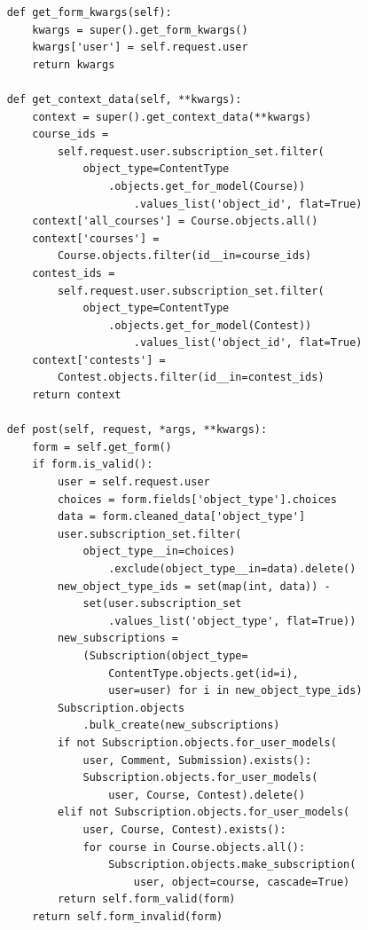 \documentclass[14pt, a4paper, oneside]{extarticle}
\begin{document}
\begin{enumerate}[wide, labelindent=0pt]
{\begin{verbatim}
    def get_form_kwargs(self):
        kwargs = super().get_form_kwargs()
        kwargs['user'] = self.request.user
        return kwargs

    def get_context_data(self, **kwargs):
        context = super().get_context_data(**kwargs)
        course_ids = 
            self.request.user.subscription_set.filter(
                object_type=ContentType
                    .objects.get_for_model(Course))
                        .values_list('object_id', flat=True)
        context['all_courses'] = Course.objects.all()
        context['courses'] = 
            Course.objects.filter(id__in=course_ids)
        contest_ids = 
            self.request.user.subscription_set.filter(
                object_type=ContentType
                    .objects.get_for_model(Contest))
                        .values_list('object_id', flat=True)
        context['contests'] = 
            Contest.objects.filter(id__in=contest_ids)
        return context

    def post(self, request, *args, **kwargs):
        form = self.get_form()
        if form.is_valid():
            user = self.request.user
            choices = form.fields['object_type'].choices
            data = form.cleaned_data['object_type']
            user.subscription_set.filter(
                object_type__in=choices)
                    .exclude(object_type__in=data).delete()
            new_object_type_ids = set(map(int, data)) - 
                set(user.subscription_set
                    .values_list('object_type', flat=True))
            new_subscriptions = 
                (Subscription(object_type=
                    ContentType.objects.get(id=i), 
                    user=user) for i in new_object_type_ids)
            Subscription.objects
                .bulk_create(new_subscriptions)
            if not Subscription.objects.for_user_models(
                user, Comment, Submission).exists():
                Subscription.objects.for_user_models(
                    user, Course, Contest).delete()
            elif not Subscription.objects.for_user_models(
                user, Course, Contest).exists():
                for course in Course.objects.all():
                    Subscription.objects.make_subscription(
                        user, object=course, cascade=True)
            return self.form_valid(form)
        return self.form_invalid(form)
    

\end{verbatim}}
\end{enumerate}
\end{document}
